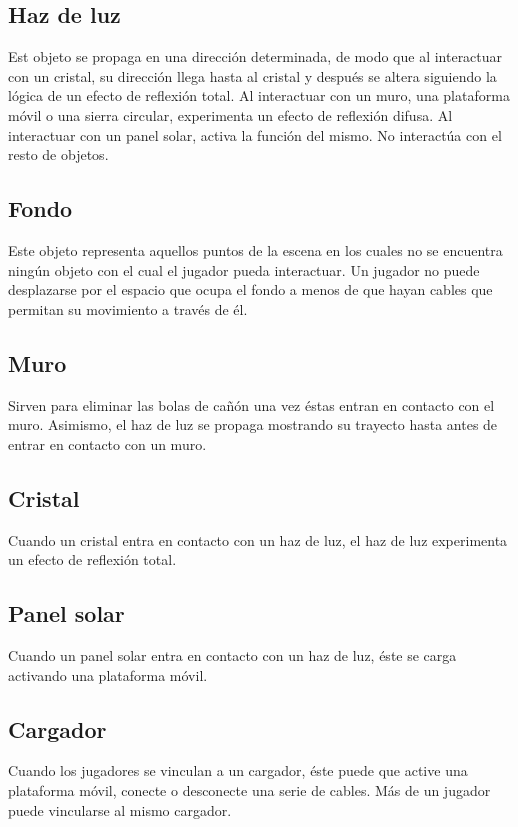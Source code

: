 \documentclass{article}
\begin{document}
\subsection{Haz de luz}
Est objeto se propaga en una dirección determinada, de modo que al interactuar con un cristal, su dirección llega hasta al cristal y después se altera siguiendo la lógica de un efecto de reflexión total. Al interactuar con un muro, una plataforma móvil o una sierra circular, experimenta un efecto de reflexión difusa. Al interactuar con un panel solar, activa la función del mismo. No interactúa con el resto de objetos.
\subsection{Fondo}
Este objeto representa aquellos puntos de la escena en los cuales no se encuentra ningún objeto con el cual el jugador pueda interactuar. Un jugador no puede desplazarse por el espacio que ocupa el fondo a menos de que hayan cables que permitan su movimiento a través de él. 
\subsection{Muro}
Sirven para eliminar las bolas de cañón una vez éstas entran en contacto con el muro. Asimismo, el haz de luz se propaga mostrando su trayecto hasta antes de entrar en contacto con un muro.
\subsection{Cristal}
Cuando un cristal entra en contacto con un haz de luz, el haz de luz experimenta un efecto de reflexión total.
\subsection{Panel solar}
Cuando un panel solar entra en contacto con un haz de luz, éste se carga activando una plataforma móvil.
\subsection{Cargador}
Cuando los jugadores se vinculan a un cargador, éste puede que active una plataforma móvil, conecte o desconecte una serie de cables. Más de un jugador puede vincularse al mismo cargador.
\end{document}
